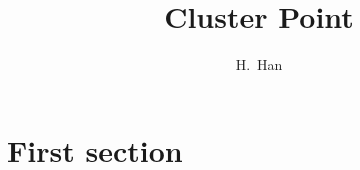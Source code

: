 \documentclass{beamer}
\title[Cluster Point] %
{Cluster Point}
\author[H.~Han]
{H.~Han}
\begin{document}
\frame{\titlepage}




\section{First section}

%



%
%

\end{document}
